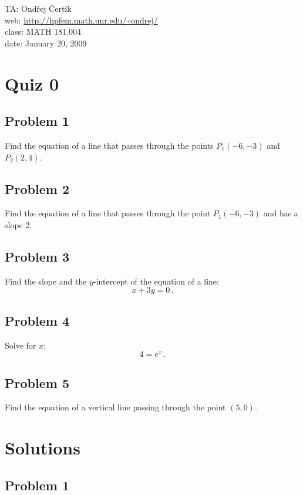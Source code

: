 \documentclass[10pt]{article}
\begin{document}
\noindent TA: Ondřej Čertík\\
web: \url{http://hpfem.math.unr.edu/~ondrej/}\\
class: MATH 181.004\\
date: January 20, 2009

\section*{Quiz 0}

\subsection*{Problem 1}

Find the equation of a line that passes through the points $P_1(-6, -3)$ and
$P_2(2, 4)$.

\subsection*{Problem 2}

Find the equation of a line that passes through the point $P_1(-6, -3)$ and has
a slope 2.

\subsection*{Problem 3}

Find the slope and the $y$-intercept of the equation of a line:
$$x+3y=0\,.$$

\subsection*{Problem 4}

Solve for $x$:
$$4=e^x\,.$$

\subsection*{Problem 5}

Find the equation of a vertical line passing through the point $(5, 0)$.

\section*{Solutions}

\subsection*{Problem 1}
\end{document}
